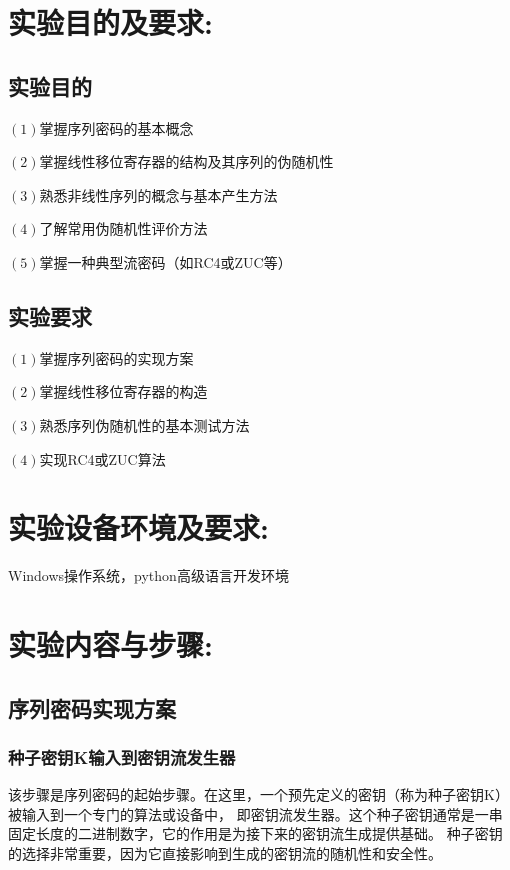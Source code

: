 \documentclass[a4paper,11pt,UTF8]{ctexart}
\begin{document}
\section{实验目的及要求:}

  \subsection{实验目的}
    $(1)$掌握序列密码的基本概念\par
    $(2)$掌握线性移位寄存器的结构及其序列的伪随机性\par
    $(3)$熟悉非线性序列的概念与基本产生方法\par
    $(4)$了解常用伪随机性评价方法\par
    $(5)$掌握一种典型流密码（如RC4或ZUC等）\par

  \subsection{实验要求}
    $(1)$掌握序列密码的实现方案\par
    $(2)$掌握线性移位寄存器的构造\par
    $(3)$熟悉序列伪随机性的基本测试方法\par
    $(4)$实现RC4或ZUC算法\par


\section{实验设备环境及要求:}
  Windows操作系统，python高级语言开发环境

\section{实验内容与步骤:}

  \subsection{序列密码实现方案}
    \subsubsection{种子密钥K输入到密钥流发生器}
      该步骤是序列密码的起始步骤。在这里，一个预先定义的密钥（称为种子密钥K）被输入到一个专门的算法或设备中，
      即密钥流发生器。这个种子密钥通常是一串固定长度的二进制数字，它的作用是为接下来的密钥流生成提供基础。
      种子密钥的选择非常重要，因为它直接影响到生成的密钥流的随机性和安全性。
\end{document}
